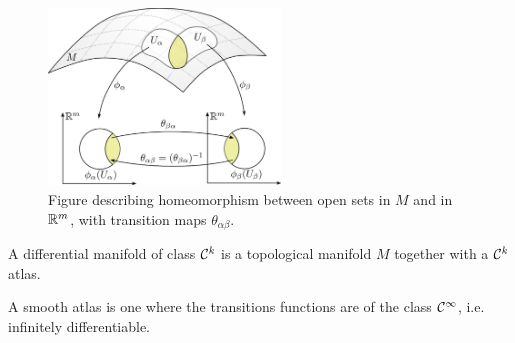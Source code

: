 \begin{figure}[H]
	\centering
	\centerline{\includegraphics[width=0.55\textwidth]{Figures/diffhomeoreal.eps}}
	\caption{Figure describing homeomorphism between open sets in $M$ and in $\mathbb R^m$, with transition maps $\theta_{\alpha\beta}$.}
\end{figure}

\begin{definition}[Provisional]
	A differential manifold of class $\mathcal{C}^k$ is a topological manifold $M$ together with a $\mathcal{C}^k$ atlas.
\end{definition}

\begin{remark}[Smoothness]
	A smooth atlas is one where the transitions functions are of the class $\mathcal{C}^\infty$, i.e. infinitely differentiable.
\end{remark}

